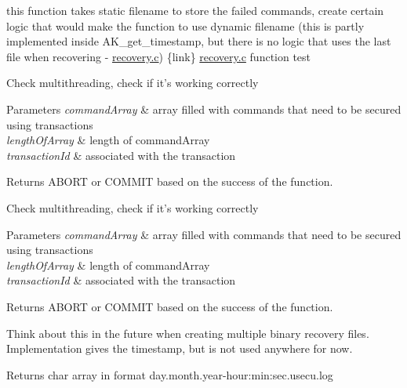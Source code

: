 \begin{DoxyRefList}
\item[\label{todo__todo000001}%
\hypertarget{todo__todo000001}{}%
Member \hyperlink{archive__log_8h_a196d56d3daa734a4817e78e5e62c6dd0}{A\+K\+\_\+archive\+\_\+log} ()]this function takes static filename to store the failed commands, create certain logic that would make the function to use dynamic filename (this is partly implemented inside A\+K\+\_\+get\+\_\+timestamp, but there is no logic that uses the last file when recovering -\/ \hyperlink{recovery_8c}{recovery.\+c}) \{link\} \hyperlink{recovery_8c}{recovery.\+c} function test  
\item[\label{todo__todo000005}%
\hypertarget{todo__todo000005}{}%
Member \hyperlink{transaction_8h_ae63e0defc409bd7cd8b12f0fe44739c8}{A\+K\+\_\+execute\+\_\+commands} (command $\ast$, int)]Check multithreading, check if it's working correctly 
\begin{DoxyParams}{Parameters}
{\em command\+Array} & array filled with commands that need to be secured using transactions \\
\hline
{\em length\+Of\+Array} & length of command\+Array \\
\hline
{\em transaction\+Id} & associated with the transaction \\
\hline
\end{DoxyParams}
\begin{DoxyReturn}{Returns}
A\+B\+O\+R\+T or C\+O\+M\+M\+I\+T based on the success of the function.  
\end{DoxyReturn}

\item[\label{todo__todo000005}%
\hypertarget{todo__todo000005}{}%
Member \hyperlink{transaction_8h_ae63e0defc409bd7cd8b12f0fe44739c8}{A\+K\+\_\+execute\+\_\+commands} (command $\ast$, int)]Check multithreading, check if it's working correctly 
\begin{DoxyParams}{Parameters}
{\em command\+Array} & array filled with commands that need to be secured using transactions \\
\hline
{\em length\+Of\+Array} & length of command\+Array \\
\hline
{\em transaction\+Id} & associated with the transaction \\
\hline
\end{DoxyParams}
\begin{DoxyReturn}{Returns}
A\+B\+O\+R\+T or C\+O\+M\+M\+I\+T based on the success of the function.  
\end{DoxyReturn}

\item[\label{todo__todo000002}%
\hypertarget{todo__todo000002}{}%
Member \hyperlink{archive__log_8h_aeb31379a188616575d445bcb0fd6a982}{A\+K\+\_\+get\+\_\+timestamp} ()]Think about this in the future when creating multiple binary recovery files. Implementation gives the timestamp, but is not used anywhere for now. \begin{DoxyReturn}{Returns}
char array in format day.\+month.\+year-\/hour\+:min\+:sec.\+usecu.\+log  
\end{DoxyReturn}


\end{DoxyRefList}
